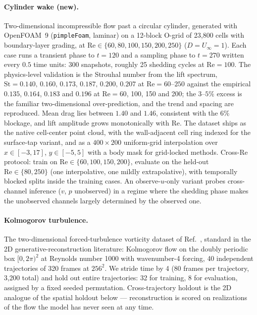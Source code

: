 \documentclass[aip,pof,reprint,amsmath,amssymb,superscriptaddress]{revtex4-1}
\begin{document}
\paragraph{Cylinder wake (new).} Two-dimensional incompressible flow past a
circular cylinder, generated with OpenFOAM~9 (\texttt{pimpleFoam}, laminar) on
a 12-block O-grid of 23{,}800 cells with boundary-layer grading, at
$\mathrm{Re}\in\{60,80,100,150,200,250\}$ ($D=U_\infty=1$). Each case runs a
transient phase to $t=120$ and a sampling phase to $t=270$ written every
$0.5$ time units: 300 snapshots, roughly 25 shedding cycles at
$\mathrm{Re}=100$. The physics-level validation is the Strouhal number from
the lift spectrum, $\mathrm{St}=0.140,\,0.160,\,0.173,\,0.187,\,0.200,\,0.207$
at $\mathrm{Re}=60$--$250$ against the empirical $0.135$, $0.164$, $0.183$
and $0.196$ at $\mathrm{Re}=60$, 100, 150 and
200;\cite{williamson1996vortex,norberg2003fluctuating} the $3$--$5\%$ excess
is the familiar two-dimensional over-prediction, and the trend and spacing are
reproduced. Mean drag lies between $1.40$ and $1.46$, consistent with the 6\%
blockage, and lift amplitude grows monotonically with $\mathrm{Re}$. The
dataset ships as the native cell-center point cloud, with the wall-adjacent
cell ring indexed for the surface-tap variant, and as a $400\times200$
uniform-grid interpolation over $x\in[-3,17]$, $y\in[-5,5]$ with a body mask
for grid-locked methods. Cross-Re protocol: train on
$\mathrm{Re}\in\{60,100,150,200\}$, evaluate on the held-out
$\mathrm{Re}\in\{80,250\}$ (one interpolative, one mildly extrapolative), with
temporally blocked splits inside the training cases. An observe-$u$-only
variant probes cross-channel inference ($v$, $p$ unobserved) in a regime where
the shedding phase makes the unobserved channels largely determined by the
observed one.

\paragraph{Kolmogorov turbulence.} The two-dimensional forced-turbulence
vorticity dataset of Ref.~, standard in the 2D
generative-reconstruction literature: Kolmogorov flow on the doubly periodic
box $[0,2\pi)^2$ at Reynolds number 1000 with wavenumber-4 forcing, 40
independent trajectories of 320 frames at $256^2$. We stride time by 4 (80 frames per trajectory, 3{,}200
total) and hold out entire trajectories: 32 for training, 8 for evaluation,
assigned by a fixed seeded permutation. Cross-trajectory holdout is the 2D
analogue of the spatial holdout below --- reconstruction is scored on
realizations of the flow the model has never seen at any time.
\end{document}
